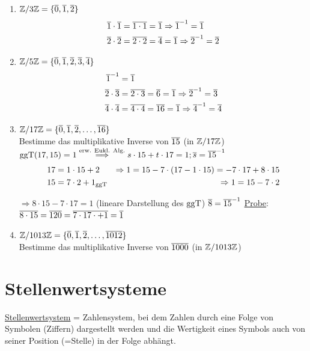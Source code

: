 \Bsps
\begin{enumerate}
	\item $\mathbb{Z}/3\mathbb{Z}=\{\overline{0},\overline{1},\overline{2}\}$\\
	\begin{align*}
	\overline{1}\cdot\overline{1} &=\overline{1\cdot 1} = \overline{1} \Rightarrow {\overline{1}}^{-1} = \overline{1}\\
	\overline{2}\cdot\overline{2} &=\overline{2\cdot 2} = \overline{4} = \overline{1} \Rightarrow {\overline{2}}^{-1} = \overline{2}\\
	\end{align*}
	
	\item $\mathbb{Z}/5\mathbb{Z}=\{\overline{0},\overline{1},\overline{2},\overline{3},\overline{4}\}$\\
	\begin{align*}
	{\overline{1}}^{-1} &= \overline{1}\\
	\overline{2}\cdot\overline{3} &=\overline{2\cdot 3} = \overline{6} = \overline{1} \Rightarrow {\overline{2}}^{-1} = \overline{3}\\
	\overline{4}\cdot\overline{4} &=\overline{4\cdot 4} = \overline{16} = \overline{1} \Rightarrow {\overline{4}}^{-1} = \overline{4}\\
	\end{align*}
	
	\item $\mathbb{Z}/17\mathbb{Z}=\{\overline{0},\overline{1},\overline{2},\ldots,\overline{16}\}$\\
	Bestimme das multiplikative Inverse von $\overline{15}$ (in $\mathbb{Z}/17\mathbb{Z}$)\\
	$\mathbin\text{ggT}(17,15) = 1 \stackrel{\text{erw. Eukl. Alg.}}{\Longrightarrow} s\cdot15+t\cdot17 = 1; \overline{s} = {\overline{15}}^{-1}$
	\begin{align*}
	17 &= 1\cdot 15 + 2 &\Rightarrow 1= 15-7\cdot (17-1\cdot 15) = -7\cdot 17+8\cdot 15\\
	15 &= 7\cdot 2 + 1_{\mathbin\text{ggT}} &\Rightarrow 1= 15-7\cdot 2\\
	\end{align*}
	
	$\Rightarrow 8\cdot 15 -7\cdot 17 = 1$ (lineare Darstellung des $\mathbin\text{ggT}$)
	$\overline{8} = {\overline{15}}^{-1}$ \ul{Probe}: $\overline{8\cdot 15} = \overline{120} = \overline{7\cdot17\cdot +1} = \overline{1}$
	
	\item $\mathbb{Z}/1013\mathbb{Z}=\{\overline{0},\overline{1},\overline{2},\ldots,\overline{1012}\}$\\
	Bestimme das multiplikative Inverse von $\overline{1000}$ (in $\mathbb{Z}/1013\mathbb{Z}$)\\
\end{enumerate}

\clearpage
\section{Stellenwertsysteme}
\ul{Stellenwertsystem} = Zahlensystem, bei dem Zahlen durch eine Folge von Symbolen (Ziffern) dargestellt werden und die Wertigkeit eines Symbols auch von seiner Position (=Stelle) in der Folge abhängt.

